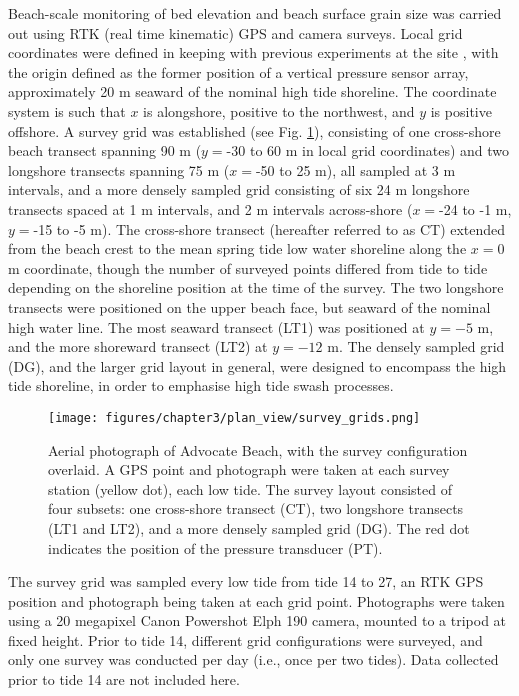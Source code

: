 \documentclass[preprint,12pt,authoryear]{elsarticle}
\begin{document}
Beach-scale monitoring of bed elevation and beach surface grain size was carried out using RTK (real time kinematic) GPS and camera surveys. Local grid coordinates were defined in keeping with previous experiments at the site \citep[see][]{Guest_Hay2017, Guest_Hay2019}, with the origin defined as the former position of a vertical pressure sensor array, approximately 20 m seaward of the nominal high tide shoreline. The coordinate system is such that $x$ is alongshore, positive to the northwest, and $y$ is positive offshore. A survey grid was established (see Fig. \ref{fig:survey_grids}), consisting of one cross-shore beach transect spanning 90 m ($y=$-30 to 60 m in local grid coordinates) and two longshore transects spanning 75 m ($x=$-50 to 25 m), all sampled at 3 m intervals, and a more densely sampled grid consisting of six 24 m longshore transects spaced at 1 m intervals, and 2 m intervals across-shore ($x=$-24 to -1 m, $y=$-15 to -5 m). The cross-shore transect (hereafter referred to as CT) extended from the beach crest to the mean spring tide low water shoreline along the $x=0$ m coordinate, though the number of surveyed points differed from tide to tide depending on the shoreline position at the time of the survey. The two longshore transects were positioned on the upper beach face, but seaward of the nominal high water line. The most seaward transect (LT1) was positioned at $y=-5$ m, and the more shoreward transect (LT2) at $y=-12$ m. The densely sampled grid (DG), and the larger grid layout in general, were designed to encompass the high tide shoreline, in order to emphasise high tide swash processes. 

\begin{figure}[tbp] %
	\texttt{[image: figures/chapter3/plan\_view/survey\_grids.png]}
	\caption[Advocate Beach aerial photograph and survey grid configuration]{Aerial photograph of Advocate Beach, with the survey configuration overlaid. A GPS point and photograph were taken at each survey station (yellow dot), each low tide. The survey layout consisted of four subsets: one cross-shore transect (CT), two longshore transects (LT1 and LT2), and a more densely sampled grid (DG). The red dot indicates the position of the pressure transducer (PT). \label{fig:survey_grids}}
\end{figure}

The survey grid was sampled every low tide from tide 14 to 27, an RTK GPS position and photograph being taken at each grid point. Photographs were taken using a 20 megapixel Canon Powershot Elph 190 camera, mounted to a tripod at fixed height. Prior to tide 14, different grid configurations were surveyed, and only one survey was conducted per day (i.e., once per two tides). Data collected prior to tide 14 are not included here. 
\end{document}
